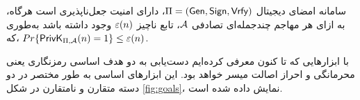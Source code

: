\begin{definition}
سامانه‌ امضای دیجیتال 
$\Pi = (\mathsf{Gen}, \mathsf{Sign}, \mathsf{Vrfy})$، 
دارای امنیت جعل‌ناپذیری است هرگاه، به ازای هر مهاجم چندجمله‌ای تصادفی 
$\mathcal{A}$، 
تابع ناچیز 
$\varepsilon(n)$
وجود داشته باشد به‌طوری که، 
$Pr\{\mathsf{PrivK}_{\Pi,\mathcal{A}}(n) = 1\}\leq \varepsilon(n)$.
\end{definition}

با ابزارهایی که تا کنون معرفی کرده‌ایم دست‌یابی به دو هدف اساسی رمزنگاری یعنی محرمانگی و احراز اصالت میسر خواهد بود. این ابزارهای اساسی به طور مختصر در دو دسته متقارن و نامتقارن در شکل 
\ref{fig:goals}، 
نمایش داده شده است. 
